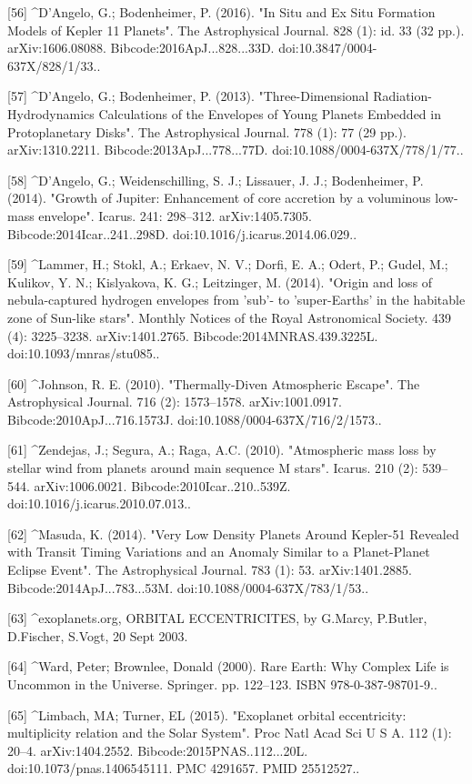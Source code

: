 [56]
^D'Angelo, G.; Bodenheimer, P. (2016). "In Situ and Ex Situ Formation Models of Kepler 11 Planets". The Astrophysical Journal. 828 (1): id. 33 (32 pp.). arXiv:1606.08088. Bibcode:2016ApJ...828...33D. doi:10.3847/0004-637X/828/1/33..

[57]
^D'Angelo, G.; Bodenheimer, P. (2013). "Three-Dimensional Radiation-Hydrodynamics Calculations of the Envelopes of Young Planets Embedded in Protoplanetary Disks". The Astrophysical Journal. 778 (1): 77 (29 pp.). arXiv:1310.2211. Bibcode:2013ApJ...778...77D. doi:10.1088/0004-637X/778/1/77..

[58]
^D'Angelo, G.; Weidenschilling, S. J.; Lissauer, J. J.; Bodenheimer, P. (2014). "Growth of Jupiter: Enhancement of core accretion by a voluminous low-mass envelope". Icarus. 241: 298–312. arXiv:1405.7305. Bibcode:2014Icar..241..298D. doi:10.1016/j.icarus.2014.06.029..

[59]
^Lammer, H.; Stokl, A.; Erkaev, N. V.; Dorfi, E. A.; Odert, P.; Gudel, M.; Kulikov, Y. N.; Kislyakova, K. G.; Leitzinger, M. (2014). "Origin and loss of nebula-captured hydrogen envelopes from 'sub'- to 'super-Earths' in the habitable zone of Sun-like stars". Monthly Notices of the Royal Astronomical Society. 439 (4): 3225–3238. arXiv:1401.2765. Bibcode:2014MNRAS.439.3225L. doi:10.1093/mnras/stu085..

[60]
^Johnson, R. E. (2010). "Thermally-Diven Atmospheric Escape". The Astrophysical Journal. 716 (2): 1573–1578. arXiv:1001.0917. Bibcode:2010ApJ...716.1573J. doi:10.1088/0004-637X/716/2/1573..

[61]
^Zendejas, J.; Segura, A.; Raga, A.C. (2010). "Atmospheric mass loss by stellar wind from planets around main sequence M stars". Icarus. 210 (2): 539–544. arXiv:1006.0021. Bibcode:2010Icar..210..539Z. doi:10.1016/j.icarus.2010.07.013..

[62]
^Masuda, K. (2014). "Very Low Density Planets Around Kepler-51 Revealed with Transit Timing Variations and an Anomaly Similar to a Planet-Planet Eclipse Event". The Astrophysical Journal. 783 (1): 53. arXiv:1401.2885. Bibcode:2014ApJ...783...53M. doi:10.1088/0004-637X/783/1/53..

[63]
^exoplanets.org, ORBITAL ECCENTRICITES, by G.Marcy, P.Butler, D.Fischer, S.Vogt, 20 Sept 2003.

[64]
^Ward, Peter; Brownlee, Donald (2000). Rare Earth: Why Complex Life is Uncommon in the Universe. Springer. pp. 122–123. ISBN 978-0-387-98701-9..

[65]
^Limbach, MA; Turner, EL (2015). "Exoplanet orbital eccentricity: multiplicity relation and the Solar System". Proc Natl Acad Sci U S A. 112 (1): 20–4. arXiv:1404.2552. Bibcode:2015PNAS..112...20L. doi:10.1073/pnas.1406545111. PMC 4291657. PMID 25512527..

